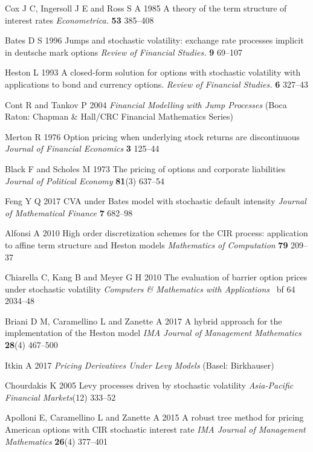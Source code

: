 \documentclass[a4paper]{jpconf}
\begin{document}
\begin{thebibliography}{18}

 Cox J C, Ingersoll J E and Ross S A 1985 A theory of the term structure of interest rates  {\it Econometrica.} {\bf 53} 385--408

 Bates D S 1996 Jumps and stochastic volatility: exchange rate processes implicit in deutsche mark options {\it Review of Financial Studies.}  {\bf 9} 69--107

 Heston L 1993 A closed-form solution for options with stochastic volatility with applications to bond and currency options. {\it Review of Financial Studies.} {\bf 6} 327--43

 Cont R and Tankov P 2004 {\it Financial Modelling with Jump Processes} (Boca Raton: Chapman \& Hall/CRC Financial Mathematics Series)

 Merton R 1976 Option pricing when underlying stock returns are discontinuous {\it Journal of Financial Economics} {\bf 3} 125--44

 Black F and Scholes M 1973 The pricing of options and corporate liabilities {\it Journal of Political Economy} {\bf 81}(3) 637--54

 Feng Y Q 2017 CVA under Bates model with stochastic default intensity {\it Journal of Mathematical Finance} {\bf 7} 682--98

 Alfonsi A 2010 High order discretization schemes for the CIR process: application to affine term structure and Heston models {\it Mathematics of Computation} {\bf 79} 209--37

 Chiarella C, Kang B and Meyer G H 2010 The evaluation of barrier option prices under stochastic volatility {\it Computers \& Mathematics with Applications} {\ bf 64} 2034--48

 Briani D M, Caramellino L and Zanette A 2017 A hybrid approach for the implementation of the Heston model {\it IMA Journal of Management Mathematics} {\bf 28}(4) 467--500

 Itkin A 2017 {\it Pricing Derivatives Under Levy Models} (Basel: Birkhauser) 

 Chourdakis K 2005 Levy processes driven by stochastic volatility {\it Asia-Pacific Financial Markets}(12) 333--52

 Apolloni E, Caramellino L and Zanette A 2015 A robust tree method for pricing American options with CIR stochastic interest rate {\it IMA Journal of Management Mathematics} {\bf 26}(4) 377--401


\end{thebibliography}
\end{document}
